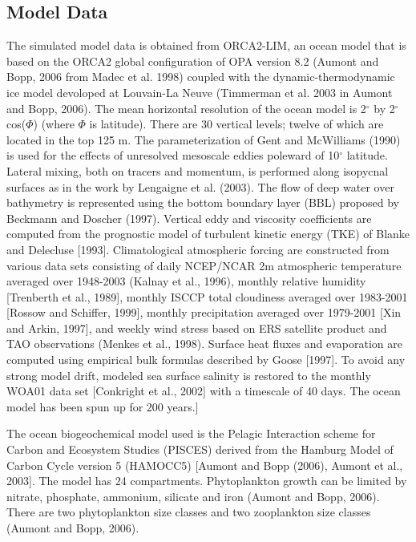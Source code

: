 \documentclass[11pt, a4paper]{article}
\numberwithin{figure}{section}
\numberwithin{table}{section}
\begin{document}
\subsection{Model Data}
The simulated model data is obtained from ORCA2-LIM, an ocean model that is 
based on the ORCA2 global configuration of OPA version 8.2 
(Aumont and Bopp, 2006 from Madec et al. 1998) coupled with the
 dynamic-thermodynamic ice model devoloped at Louvain-La Neuve 
 (Timmerman et al. 2003 in Aumont and Bopp, 2006). 
The mean horizontal resolution of the ocean model is 
2$^{\circ}$ by 2$^{\circ}$ cos($\Phi$) (where $\Phi$ is latitude). 
There are 30 vertical levels; twelve of which are located in the top 125 m. 
The parameterization of Gent and McWilliams (1990) is used for the effects of 
unresolved mesoscale eddies poleward of 10$^{\circ}$ latitude. 
Lateral mixing, both on tracers and momentum, is performed along isopycnal 
surfaces as in the work by Lengaigne et al. (2003). 
The flow of deep water over bathymetry is represented using the bottom boundary 
layer (BBL) proposed by Beckmann and Doscher (1997). 
Vertical eddy and viscosity coefficients are computed from the prognostic model 
of turbulent kinetic energy (TKE) of Blanke and Delecluse [1993]. 
Climatological atmospheric forcing are constructed from various data sets 
consisting of daily NCEP/NCAR 2m atmospheric temperature averaged over 1948-2003 
(Kalnay et al., 1996), monthly relative humidity [Trenberth et al., 1989],
monthly ISCCP total cloudiness averaged over 1983-2001 [Rossow and Schiffer, 1999], 
monthly precipitation averaged over 1979-2001 [Xin and Arkin, 1997], and 
weekly wind stress based on ERS satellite product and TAO observations 
(Menkes et al., 1998). Surface heat fluxes and evaporation are computed using 
empirical bulk formulas described by Goose [1997]. 
To avoid any strong model drift, modeled sea surface salinity is restored to the 
monthly WOA01 data set [Conkright et al., 2002] with a timescale of 40 days. 
The ocean model has been spun up for 200 years.]

The ocean biogeochemical model used is the Pelagic Interaction scheme for 
Carbon and Ecosystem Studies (PISCES) derived from the Hamburg Model of 
Carbon Cycle version 5 (HAMOCC5) [Aumont and Bopp (2006), Aumont et al., 2003]. 
The model has 24 compartments. Phytoplankton growth can be limited by nitrate, 
phosphate, ammonium, silicate and iron (Aumont and Bopp, 2006). 
There are two phytoplankton size classes and two zooplankton size classes 
(Aumont and Bopp, 2006). 
\end{document}
